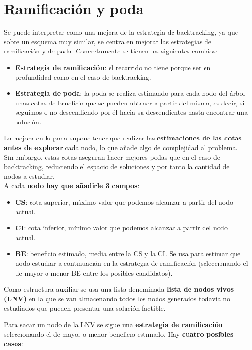 \documentclass{article}
\begin{document}
\section{Ramificación y poda}
Se puede interpretar como una mejora de la estrategia de backtracking, ya que sobre un
esquema muy similar, se centra en mejorar las estrategias de ramificación y de poda. Concretamente se tienen los siguientes cambios:
\begin{itemize}
    \item \textbf{Estrategia de ramificación}: el recorrido no tiene porque ser en profundidad como en el caso de backtracking.
    \item \textbf{Estrategia de poda}: la poda se realiza estimando para cada nodo del árbol unas cotas de beneficio que se pueden obtener a partir del mismo, es decir, si seguimos o no descendiendo por él hacia su descendientes hasta encontrar una solución.
\end{itemize}

La mejora en la poda supone tener que realizar las \textbf{estimaciones de las cotas antes de explorar} cada nodo, lo que añade algo de complejidad al problema. Sin embargo, estas cotas aseguran
hacer mejores podas que en el caso de backtracking, reduciendo el espacio de soluciones y por
tanto la cantidad de nodos a estudiar. \\

A cada \textbf{nodo hay que añadirle 3 campos}: 
\begin{itemize}
    \item \textbf{CS}: cota superior, máximo valor que podemos alcanzar a partir del nodo actual.
    \item \textbf{CI}: cota inferior, mínimo valor que podemos alcanzar a partir del nodo actual.
    \item \textbf{BE}: beneficio estimado, media entre la CS y la CI. Se usa para estimar que nodo estudiar a continuación en la estrategia de ramificación (seleccionando el de mayor o menor BE
    entre los posibles candidatos).
\end{itemize}

Como estructura auxiliar se usa una lista denominada \textbf{lista de nodos vivos (LNV)} en la que se van almacenando todos los nodos generados todavía no estudiados que pueden presentar una solución factible.

Para sacar un nodo de la LNV se sigue una \textbf{estrategia de ramificación} seleccionando el de
mayor o menor beneficio estimado. Hay \textbf{cuatro posibles casos}:
\end{document}
